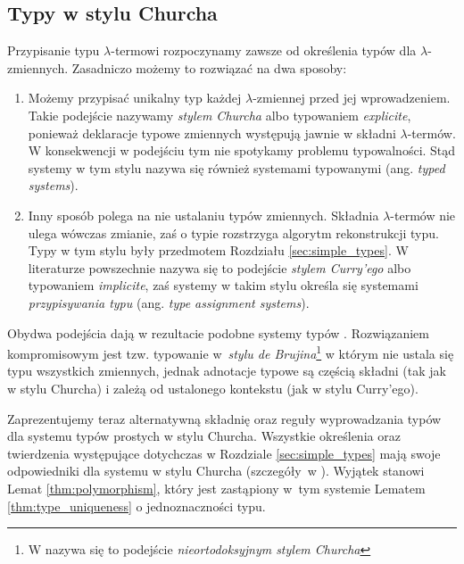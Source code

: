 \subsection{Typy w stylu Churcha}\label{subsec:church_style}
Przypisanie typu \(\lambda\)-termowi rozpoczynamy zawsze od określenia typów dla \(\lambda\)-zmiennych. Zasadniczo możemy to rozwiązać na dwa sposoby:

\begin{enumerate}
  \item Możemy przypisać unikalny typ każdej \(\lambda\)-zmiennej przed jej wprowadzeniem. Takie podejście nazywamy \emph{stylem Churcha} albo typowaniem \emph{explicite}, ponieważ deklaracje typowe zmiennych występują jawnie w składni \(\lambda\)-termów. W konsekwencji w podejściu tym nie spotykamy problemu typowalności. Stąd systemy w tym stylu nazywa się również systemami {typowanymi} (ang. \emph{typed systems}).
  \item Inny sposób polega na nie ustalaniu typów zmiennych. Składnia \(\lambda\)-termów nie ulega wówczas zmianie, zaś o typie rozstrzyga algorytm rekonstrukcji typu. Typy w tym stylu były przedmotem Rozdziału \ref{sec:simple_types}. W literaturze powszechnie nazywa się to podejście \emph{stylem Curry'ego} albo typowaniem \emph{implicite}, zaś systemy w takim stylu określa się systemami \emph{przypisywania typu} (ang. \emph{type assignment systems}).
\end{enumerate}

Obydwa podejścia dają w rezultacie podobne systemy typów \cite[Rozdział 3.4]{Urzyczyn2006}.  %
Rozwiązaniem kompromisowym jest tzw. typowanie w~\emph{stylu de Brujina}\footnote{W \cite{Urzyczyn2006} nazywa się to podejście \emph{nieortodoksyjnym stylem Churcha}} \cite[1A.33]{barendregt_dekkers_statman_2013} w którym nie ustala się typu wszystkich zmiennych, jednak adnotacje typowe są częścią składni (tak jak w stylu Churcha) i zależą od ustalonego kontekstu (jak w stylu Curry'ego). 

Zaprezentujemy teraz alternatywną składnię oraz reguły wyprowadzania typów dla systemu typów prostych w stylu Churcha. Wszystkie określenia oraz twierdzenia występujące dotychczas w Rozdziale \ref{sec:simple_types} mają swoje odpowiedniki dla systemu w stylu Churcha (szczegóły~w \cite[Rozdział 2.10]{nederpelt_geuvers_2014}). Wyjątek stanowi Lemat \ref{thm:polymorphism}, który jest zastąpiony w~tym systemie Lematem \ref{thm:type_uniqueness} o jednoznaczności typu.

